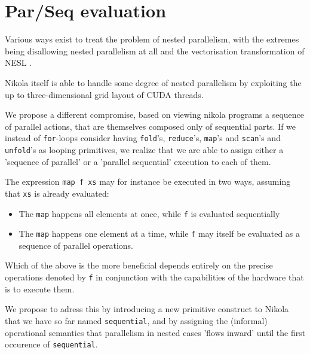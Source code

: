 \chapter{Par/Seq evaluation}

Various ways exist to treat the problem of nested parallelism, with the
extremes being disallowing nested parallelism at all and the vectorisation
transformation of NESL \cite{nesl}.

Nikola itself is able to handle some degree of nested parallelism by exploiting
the up to three-dimensional grid layout of CUDA threads.


We propose a different compromise, based on viewing nikola programs a sequence
of parallel actions, that are themselves composed only of sequential parts.  If we instead of
\texttt{for}-loops consider having \texttt{fold}'s, \texttt{reduce}'s, \texttt{map}'s
and \texttt{scan}'s and \texttt{unfold}'s as looping primitives, we realize that
we are able to assign either a 'sequence of parallel' or a 'parallel sequential'
execution to each of them.


The expression \texttt{map f xs} may for instance be executed in two ways,
assuming that \texttt{xs} is already evaluated:

\begin{itemize}

\item The \texttt{map} happens all elements at once, while \texttt{f} is
evaluated sequentially

\item The \texttt{map} happens one element at a time, while \texttt{f} may itself
be evaluated as a sequence of parallel operations.

\end{itemize}

Which of the above is the more beneficial depends entirely on the precise
operations denoted by \texttt{f} in conjunction with the capabilities of the
hardware that is to execute them.

We propose to adress this by introducing a new primitive construct to Nikola
that we have so far named \texttt{sequential}, and by assigning the (informal)
operational semantics that parallelism in nested cases 'flows inward' until the
first occurence of \texttt{sequential}.

